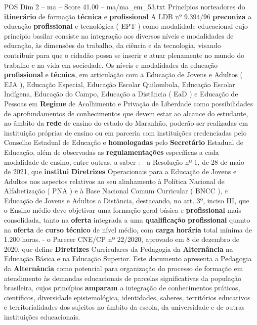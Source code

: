 \begin{textsample}{POS Dim 2 – ma – Score 41.00 – ma/ma\_em\_53.txt}  \label{ex:f2_pos_051}
Princípios norteadores do \textbf{itinerário} de formação \textbf{técnica} e \textbf{profissional} A LDB nº 9.394/96 \textbf{preconiza} a educação \textbf{profissional} e tecnológica ( EPT ) como modalidade educacional cujo princípio basilar consiste na integração aos diversos níveis e modalidades de educação, às dimensões do trabalho, da ciência e da tecnologia, visando contribuir para que o cidadão possa se inserir e atuar plenamente no mundo do trabalho e na vida em sociedade.
Os níveis e modalidades da educação \textbf{profissional} e \textbf{técnica}, em articulação com a Educação de Jovens e Adultos ( EJA ), Educação Especial, Educação Escolar Quilombola, Educação Escolar Indígena, Educação do Campo, Educação a Distância ( EaD ) e Educação de Pessoas em \textbf{Regime} de Acolhimento e Privação de Liberdade como possibilidades de aprofundamentos de conhecimentos que devem estar ao alcance do estudante, no âmbito da \textbf{rede} de ensino do estado do Maranhão, poderão ser realizadas em instituição próprias de ensino ou em parceria com instituições credenciadas pelo Conselho Estadual de Educação e \textbf{homologadas} pelo \textbf{Secretário} Estadual de Educação, além de observadas as \textbf{regulamentações} específicas a cada modalidade de ensino, entre outras, a saber : - a Resolução nº 1, de 28 de maio de 2021, que \textbf{institui} \textbf{Diretrizes} Operacionais para a Educação de Jovens e Adultos nos aspectos relativos ao seu alinhamento à Política Nacional de Alfabetização ( PNA ) e à Base Nacional Comum Curricular ( BNCC ), e Educação de Jovens e Adultos a Distância, destacando, no art. 3º, inciso III, que o Ensino médio deve objetivar uma formação geral básica e \textbf{profissional} mais consolidada, tanto na \textbf{oferta} integrada a uma \textbf{qualificação} \textbf{profissional} quanto na \textbf{oferta} de \textbf{curso} \textbf{técnico} de nível médio, com \textbf{carga} \textbf{horária} total mínima de 1.200 horas. - o Parecer CNE/CP nº 22/2020, aprovado em 8 de dezembro de 2020, que define \textbf{Diretrizes} Curriculares da Pedagogia da \textbf{Alternância} na Educação Básica e na Educação Superior.
Este documento apresenta a Pedagogia da \textbf{Alternância} como potencial para organização do processo de formação em atendimento às demandas educacionais de parcelas significativas da população brasileira, cujos princípios \textbf{amparam} a integração de conhecimentos práticos, científicos, diversidade epistemológica, identidades, saberes, territórios educativos e territorialidades dos sujeitos no âmbito da escola, da universidade e de outras instituições educacionais.

\end{textsample}

